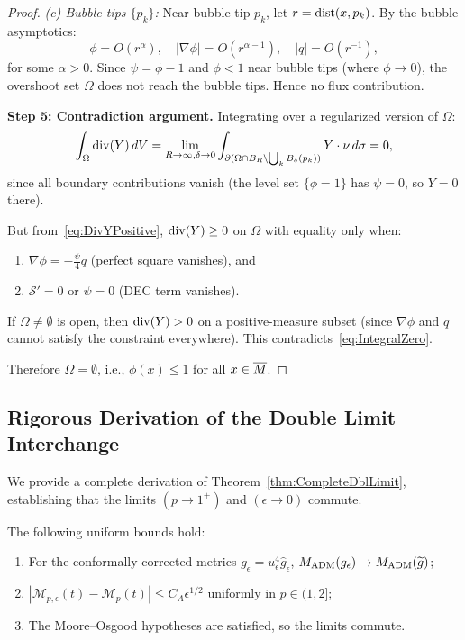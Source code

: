 \begin{proof}
\textit{(c) Bubble tips $\{p_k\}$:} Near bubble tip $p_k$, let $r = \mathrm{dist}(x, p_k)$. By the bubble asymptotics:
\begin{equation}\label{eq:BubbleDecay}
    \phi = O(r^\alpha), \quad |\nabla \phi| = O(r^{\alpha - 1}), \quad |q| = O(r^{-1}),
\end{equation}
for some $\alpha > 0$. Since $\psi = \phi - 1$ and $\phi < 1$ near bubble tips (where $\phi \to 0$), the overshoot set $\Omega$ does not reach the bubble tips. Hence no flux contribution.

\textbf{Step 5: Contradiction argument.}
Integrating over a regularized version of $\Omega$:
\begin{equation}\label{eq:IntegralZero}
    \int_\Omega \mathrm{div}(Y) \, dV = \lim_{R \to \infty, \delta \to 0} \int_{\partial(\Omega \cap B_R \setminus \bigcup_k B_\delta(p_k))} Y \cdot \nu \, d\sigma = 0,
\end{equation}
since all boundary contributions vanish (the level set $\{\phi = 1\}$ has $\psi = 0$, so $Y = 0$ there).

But from~\eqref{eq:DivYPositive}, $\mathrm{div}(Y) \ge 0$ on $\Omega$ with equality only when:
\begin{enumerate}
    \item $\nabla \phi = -\frac{\psi}{4} q$ (perfect square vanishes), and
    \item $\mathcal{S}' = 0$ or $\psi = 0$ (DEC term vanishes).
\end{enumerate}

If $\Omega \neq \emptyset$ is open, then $\mathrm{div}(Y) > 0$ on a positive-measure subset (since $\nabla \phi$ and $q$ cannot satisfy the constraint everywhere). This contradicts~\eqref{eq:IntegralZero}.

Therefore $\Omega = \emptyset$, i.e., $\phi(x) \le 1$ for all $x \in \overline{M}$.
\end{proof}

\subsection{Rigorous Derivation of the Double Limit Interchange}\label{app:DoubleLimitDerivation}

We provide a complete derivation of Theorem~\ref{thm:CompleteDblLimit}, establishing that the limits $(p \to 1^+)$ and $(\epsilon \to 0)$ commute.

\begin{theorem}\label{thm:DoubleLimitComplete-deriv}
The following uniform bounds hold:
\begin{enumerate}
    \item[(I)] For the conformally corrected metrics $g_\epsilon=u_\epsilon^4\hat g_\epsilon$, $M_{\mathrm{ADM}}(g_\epsilon) \to M_{\mathrm{ADM}}(\widetilde{g})$;
    \item[(II)] $|\mathcal{M}_{p,\epsilon}(t) - \mathcal{M}_p(t)| \le C_A \epsilon^{1/2}$ uniformly in $p \in (1, 2]$;
    \item[(III)] The Moore--Osgood hypotheses are satisfied, so the limits commute.
\end{enumerate}
\end{theorem}

